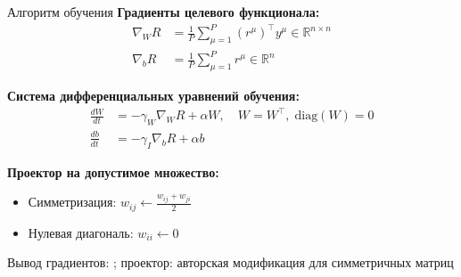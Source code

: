 \documentclass[10pt, aspectratio=169]{beamer}
\theoremstyle{plain}
\begin{document}
\begin{frame}{Алгоритм обучения}
  \textbf{Градиенты целевого функционала:}
  \begin{align}
    \nabla_W R & = \frac{1}{P} \sum_{\mu=1}^{P} (r^\mu)^\top y^\mu \in \mathbb{R}^{n \times n} \\
    \nabla_b R & = \frac{1}{P} \sum_{\mu=1}^{P} r^\mu \in \mathbb{R}^{n}
  \end{align}

  \textbf{Система дифференциальных уравнений обучения:}
  \begin{align}
    \frac{dW}{dt} & = -\gamma_W \nabla_W R + \alpha W, \quad W = W^\top, \; \mathrm{diag}(W) = 0 \\
    \frac{db}{dt} & = -\gamma_I \nabla_b R + \alpha b
  \end{align}

  \textbf{Проектор на допустимое множество:}
  \begin{itemize}
    \item Симметризация: \(w_{ij} \leftarrow \frac{w_{ij} + w_{ji}}{2}\)
    \item Нулевая диагональ: \(w_{ii} \leftarrow 0\)
  \end{itemize}

  \small{Вывод градиентов: \cite{fradkov1979}; проектор: авторская модификация для симметричных матриц}
\end{frame}
\end{document}
